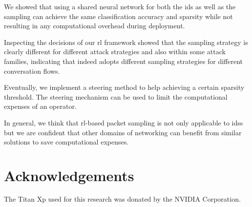 \documentclass[conference]{IEEEtran}
\begin{document}
We showed that using a shared neural network for both the \gls{ids} as well as the sampling can achieve the same classification accuracy and sparsity while not resulting in any computational overhead during deployment. 

Inspecting the decisions of our \gls{rl} framework showed that the sampling strategy is clearly different for different attack strategies and also within some attack families, indicating that \ours{} indeed adopts different sampling strategies for different conversation flows.

Eventually, we implement a steering method to help achieving a certain sparsity threshold. The steering mechanism can be used to limit the computational expenses of an operator.

In general, we think that \gls{rl}-based packet sampling is not only applicable to \glspl{ids} but we are confident that other domains of networking can benefit from similar solutions to save computational expenses.

\section*{Acknowledgements}
The Titan Xp used for this research was donated by the NVIDIA Corporation.

\renewcommand*{\bibfont}{\small}


\end{document}
